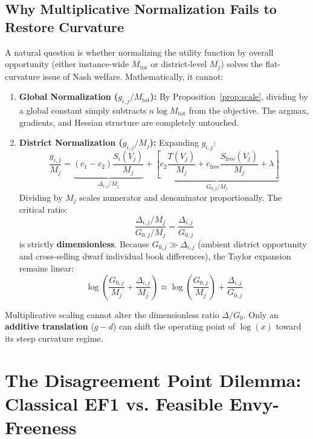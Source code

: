 \documentclass[11pt,a4paper]{article}
\theoremstyle{plain}
\theoremstyle{definition}
\begin{document}
\subsection{Why Multiplicative Normalization Fails to Restore Curvature}
A natural question is whether normalizing the utility function by overall opportunity (either instance-wide $M_{\text{tot}}$ or district-level $M_j$) solves the flat-curvature issue of Nash welfare. Mathematically, it cannot:
\begin{enumerate}[leftmargin=1.5em]
    \item \textbf{Global Normalization ($g_{i,j} / M_{\text{tot}}$):} By Proposition~\ref{prop:scale}, dividing by a global constant simply subtracts $n \log M_{\text{tot}}$ from the objective. The argmax, gradients, and Hessian structure are completely untouched.
    \item \textbf{District Normalization ($g_{i,j} / M_j$):} Expanding $g_{i,j}$:
    \begin{equation}
    \frac{g_{i,j}}{M_j} = \underbrace{(c_1 - c_2) \frac{S_i(V_j)}{M_j}}_{\Delta_{i,j} / M_j} + \underbrace{\left[ c_2 \frac{T(V_j)}{M_j} + c_{\text{free}} \frac{S_{\text{free}}(V_j)}{M_j} + \lambda \right]}_{G_{0,j} / M_j}
    \end{equation}
    Dividing by $M_j$ scales numerator and denominator proportionally. The critical ratio:
    \begin{equation}
    \frac{\Delta_{i,j} / M_j}{G_{0,j} / M_j} = \frac{\Delta_{i,j}}{G_{0,j}}
    \end{equation}
    is strictly \textbf{dimensionless}. Because $G_{0,j} \gg \Delta_{i,j}$ (ambient district opportunity and cross-selling dwarf individual book differences), the Taylor expansion remains linear:
    \begin{equation}
    \log\left( \frac{G_{0,j}}{M_j} + \frac{\Delta_{i,j}}{M_j} \right) \approx \log\left(\frac{G_{0,j}}{M_j}\right) + \frac{\Delta_{i,j}}{G_{0,j}}
    \end{equation}
\end{enumerate}
Multiplicative scaling cannot alter the dimensionless ratio $\Delta / G_0$. Only an \textbf{additive translation} ($g - d$) can shift the operating point of $\log(x)$ toward its steep curvature regime.

\section{The Disagreement Point Dilemma: Classical EF1 vs. Feasible Envy-Freeness}
\end{document}
